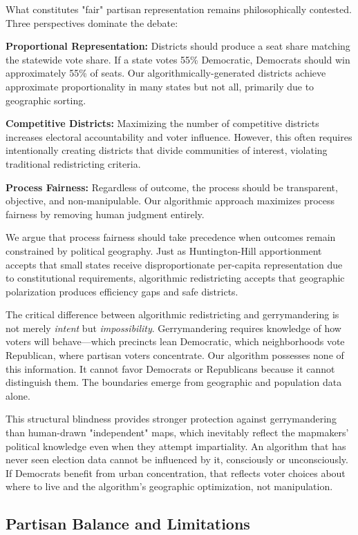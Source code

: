 What constitutes "fair" partisan representation remains philosophically contested. Three perspectives dominate the debate:

\textbf{Proportional Representation:} Districts should produce a seat share matching the statewide vote share. If a state votes 55\% Democratic, Democrats should win approximately 55\% of seats. Our algorithmically-generated districts achieve approximate proportionality in many states but not all, primarily due to geographic sorting.

\textbf{Competitive Districts:} Maximizing the number of competitive districts increases electoral accountability and voter influence. However, this often requires intentionally creating districts that divide communities of interest, violating traditional redistricting criteria.

\textbf{Process Fairness:} Regardless of outcome, the process should be transparent, objective, and non-manipulable. Our algorithmic approach maximizes process fairness by removing human judgment entirely.

We argue that process fairness should take precedence when outcomes remain constrained by political geography. Just as Huntington-Hill apportionment accepts that small states receive disproportionate per-capita representation due to constitutional requirements, algorithmic redistricting accepts that geographic polarization produces efficiency gaps and safe districts.

The critical difference between algorithmic redistricting and gerrymandering is not merely \textit{intent} but \textit{impossibility}. Gerrymandering requires knowledge of how voters will behave—which precincts lean Democratic, which neighborhoods vote Republican, where partisan voters concentrate. Our algorithm possesses none of this information. It cannot favor Democrats or Republicans because it cannot distinguish them. The boundaries emerge from geographic and population data alone.

This structural blindness provides stronger protection against gerrymandering than human-drawn "independent" maps, which inevitably reflect the mapmakers' political knowledge even when they attempt impartiality. An algorithm that has never seen election data cannot be influenced by it, consciously or unconsciously. If Democrats benefit from urban concentration, that reflects voter choices about where to live and the algorithm's geographic optimization, not manipulation.
\subsection{Partisan Balance and Limitations}

